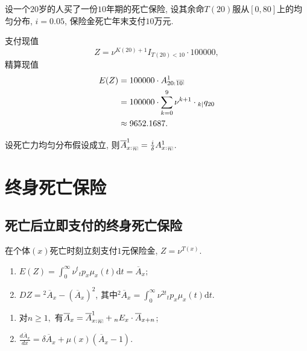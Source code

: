 \documentclass[lang=cn,10pt]{elegantbook}
\makeatletter
\DeclareRobustCommand{\annu}[1]{_{%
    \def\arraystretch{0}%
    \setlength\arraycolsep{1pt}%
    \setlength\arrayrulewidth{.2pt}%
    \begin{array}[b]{@{}c|}\hline
        \\[\arraycolsep]%
        \scriptstyle #1%
    \end{array}%
}}
\makeatother
\begin{document}
\begin{example}
    设一个$20$岁的人买了一份$10$年期的死亡保险, 设其余命$T(20)$服从$[0,80]$上的均匀分布, $i = 0.05$, 保险金死亡年末支付$10$万元.
\end{example}
\begin{solution}
	支付现值
    $$
        Z = \nu^{K(20)+1}I_{T(20)<10}\cdot 100000,
    $$
    精算现值
    \begin{align*}
        E(Z) & = 100000\cdot A_{20:}^1{}\annu{10}                         \\
             & = 100000\cdot \sum_{k=0}^{9}{\nu^{k+1}\cdot {}_{k|}q_{20}} \\
             & \approx 9652.1687.
    \end{align*}
\end{solution}

\begin{proposition}[死亡年末支付与死亡立即支付的关系]
	设死亡力均匀分布假设成立, 则$\overline{A}_{x:}^1{}_{\annu{n}}= \frac{i}{\delta}A_{x:}^1{}_{\annu{n}}$.
\end{proposition}

\section{终身死亡保险}
\subsection{死亡后立即支付的终身死亡保险}
\begin{definition}[支付现值]
	在个体$(x)$死亡时刻立刻支付$1$元保险金, $Z = \nu^{T(x)}.$
\end{definition}

\begin{proposition}[精算现值与方差]
	\begin{enumerate}
		\item $E(Z) = \int_0^\infty \nu^t{}_tp_x\mu_x(t)\mathrm{d}t = \overline{A}_x;$
		\item $DZ = {}^2\overline{A}_x - (\overline{A}_x)^2$, 其中${}^2\overline{A}_x = \int_0^\infty \nu^{2t}{}_tp_x\mu_x(t)\mathrm{d}t$.
	\end{enumerate}
\end{proposition}

\begin{corollary}[精算现值的性质]
	\begin{enumerate}
		\item 对$n\ge1,$ 有$\overline{A}_x = \overline{A}_{x:}^1{}_{\annu{n}} + {}_nE_{x}\cdot \overline{A}_{x+n}$;
		\item $\frac{d\overline{A}_x}{dx} = \delta \overline{A}_x + \mu(x)(\overline{A}_x - 1).$
	\end{enumerate}
\end{corollary}
\end{document}
